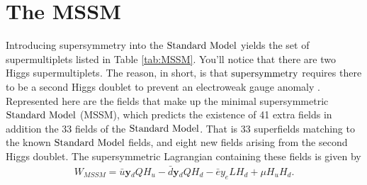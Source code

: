 \section{The MSSM}
\label{sec:mssm}
Introducing supersymmetry into the $\text{Standard\ Model}$ yields the set of supermultiplets listed in Table \ref{tab:MSSM}. You'll notice that there are two Higgs supermultiplets. The reason, in short, is that $\text{supersymmetry}$ requires there to be a second Higgs doublet to prevent an electroweak gauge anomaly \cite{Martin:1997ns}. Represented here are the fields that make up the minimal supersymmetric $\text{Standard\ Model}$ (MSSM), which predicts the existence of 41 extra fields in addition the 33 fields of the $\text{Standard\ Model}$. That is 33 superfields matching to the known $\text{Standard\ Model}$ fields, and eight new fields arising from the second Higgs doublet. The supersymmetric Lagrangian containing these fields is given by
\begin{align}
W_{MSSM}=\bar{u}\textbf{y$_d$}QH_u-\bar{d}\textbf{y$_d$}QH_d-\bar{e}y_eLH_d+\mu H_uH_d.
\end{align}

